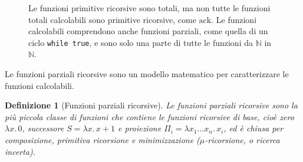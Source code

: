 \documentclass[a4paper, 11pt, oneside]{book}
\theoremstyle{formale}
\newtheorem*{definition}{Definizione}
\begin{document}
    \begin{figure}[H]
        \centering
        \caption{Le funzioni primitive ricorsive sono totali, ma non tutte le funzioni
            totali calcolabili sono primitive ricorsive, come $\mathrm{ack}$. Le
            funzioni calcolabili comprendono anche funzioni parziali, come quella di un
            ciclo \texttt{while true}, e sono solo una parte di tutte le funzioni da
            $\mathbb{N}$ in $\mathbb{N}$.}
        \label{fig:pr-totali-calcolabili}
    \end{figure}

    Le funzioni parziali ricorsive sono un modello matematico per caratterizzare le
    funzioni calcolabili.

    \begin{definition}[Funzioni parziali ricorsive]
        Le \emph{funzioni parziali ricorsive} sono la pi\`u piccola classe di funzioni
        che contiene le funzioni ricorsive di base, cio\`e zero $\lambda x.\, 0$,
        successore $S = \lambda x.\, x + 1$ e proiezione
        $\Pi_i = \lambda x_1 \dots x_n.\, x_i$, ed \`e chiusa per composizione,
        primitiva ricorsione e minimizzazione ($\mu$-ricorsione, o ricerca incerta).
    \end{definition}
\end{document}
